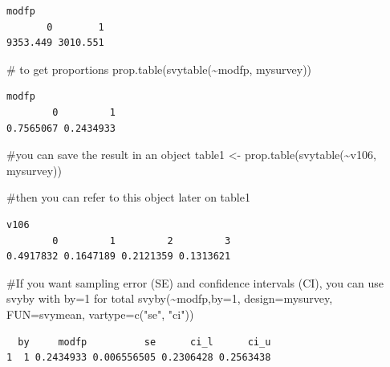 \documentclass[
  letterpaper,
  DIV=11,
  numbers=noendperiod]{scrartcl}
\newenvironment{Shaded}{\begin{snugshade}}{\end{snugshade}}
\newcommand{\AttributeTok}[1]{\textcolor[rgb]{0.40,0.45,0.13}{#1}}
\newcommand{\CommentTok}[1]{\textcolor[rgb]{0.37,0.37,0.37}{#1}}
\newcommand{\DecValTok}[1]{\textcolor[rgb]{0.68,0.00,0.00}{#1}}
\newcommand{\FunctionTok}[1]{\textcolor[rgb]{0.28,0.35,0.67}{#1}}
\newcommand{\NormalTok}[1]{\textcolor[rgb]{0.00,0.23,0.31}{#1}}
\newcommand{\OtherTok}[1]{\textcolor[rgb]{0.00,0.23,0.31}{#1}}
\newcommand{\SpecialCharTok}[1]{\textcolor[rgb]{0.37,0.37,0.37}{#1}}
\newcommand{\StringTok}[1]{\textcolor[rgb]{0.13,0.47,0.30}{#1}}
\begin{document}
\begin{verbatim}
modfp
       0        1 
9353.449 3010.551 
\end{verbatim}

\begin{Shaded}
\begin{Highlighting}[]
\CommentTok{\# to get proportions}
\FunctionTok{prop.table}\NormalTok{(}\FunctionTok{svytable}\NormalTok{(}\SpecialCharTok{\textasciitilde{}}\NormalTok{modfp, mysurvey))}
\end{Highlighting}
\end{Shaded}

\begin{verbatim}
modfp
        0         1 
0.7565067 0.2434933 
\end{verbatim}

\begin{Shaded}
\begin{Highlighting}[]
\CommentTok{\#you can save the result in an object}
\NormalTok{table1 }\OtherTok{\textless{}{-}} \FunctionTok{prop.table}\NormalTok{(}\FunctionTok{svytable}\NormalTok{(}\SpecialCharTok{\textasciitilde{}}\NormalTok{v106, mysurvey))}

\CommentTok{\#then you can refer to this object later on}
\NormalTok{table1 }
\end{Highlighting}
\end{Shaded}

\begin{verbatim}
v106
        0         1         2         3 
0.4917832 0.1647189 0.2121359 0.1313621 
\end{verbatim}

\begin{Shaded}
\begin{Highlighting}[]
\CommentTok{\#If you want sampling error (SE) and confidence intervals (CI), you can use svyby with by=1 for total}
\FunctionTok{svyby}\NormalTok{(}\SpecialCharTok{\textasciitilde{}}\NormalTok{modfp,}\AttributeTok{by=}\DecValTok{1}\NormalTok{,  }\AttributeTok{design=}\NormalTok{mysurvey, }\AttributeTok{FUN=}\NormalTok{svymean, }\AttributeTok{vartype=}\FunctionTok{c}\NormalTok{(}\StringTok{"se"}\NormalTok{, }\StringTok{"ci"}\NormalTok{))}
\end{Highlighting}
\end{Shaded}

\begin{verbatim}
  by     modfp          se      ci_l      ci_u
1  1 0.2434933 0.006556505 0.2306428 0.2563438
\end{verbatim}
\end{document}
